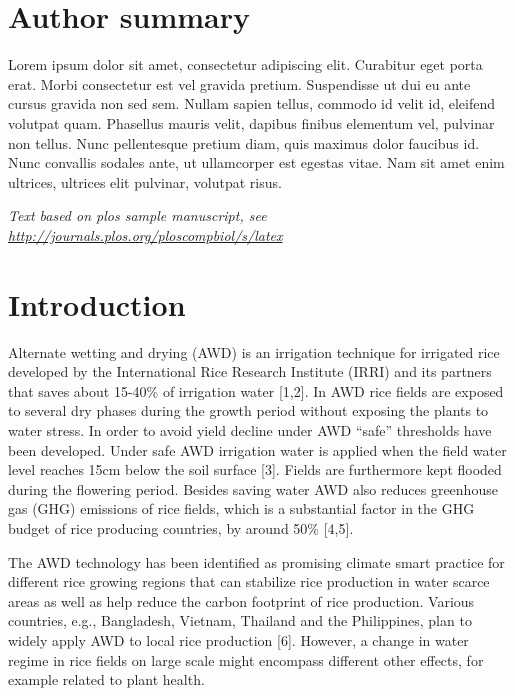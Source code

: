 \documentclass[10pt,letterpaper]{article}
\begin{document}
\section*{Author summary}
Lorem ipsum dolor sit amet, consectetur adipiscing elit. Curabitur eget
porta erat. Morbi consectetur est vel gravida pretium. Suspendisse ut
dui eu ante cursus gravida non sed sem. Nullam sapien tellus, commodo id
velit id, eleifend volutpat quam. Phasellus mauris velit, dapibus
finibus elementum vel, pulvinar non tellus. Nunc pellentesque pretium
diam, quis maximus dolor faucibus id. Nunc convallis sodales ante, ut
ullamcorper est egestas vitae. Nam sit amet enim ultrices, ultrices elit
pulvinar, volutpat risus.

\linenumbers

\emph{Text based on plos sample manuscript, see
\url{http://journals.plos.org/ploscompbiol/s/latex}}

\section{Introduction}\label{introduction}

Alternate wetting and drying (AWD) is an irrigation technique for
irrigated rice developed by the International Rice Research Institute
(IRRI) and its partners that saves about 15-40\% of irrigation water
{[}1,2{]}. In AWD rice fields are exposed to several dry phases during
the growth period without exposing the plants to water stress. In order
to avoid yield decline under AWD ``safe'' thresholds have been
developed. Under safe AWD irrigation water is applied when the field
water level reaches 15cm below the soil surface {[}3{]}. Fields are
furthermore kept flooded during the flowering period. Besides saving
water AWD also reduces greenhouse gas (GHG) emissions of rice fields,
which is a substantial factor in the GHG budget of rice producing
countries, by around 50\% {[}4,5{]}.

The AWD technology has been identified as promising climate smart
practice for different rice growing regions that can stabilize rice
production in water scarce areas as well as help reduce the carbon
footprint of rice production. Various countries, e.g., Bangladesh,
Vietnam, Thailand and the Philippines, plan to widely apply AWD to local
rice production {[}6{]}. However, a change in water regime in rice
fields on large scale might encompass different other effects, for
example related to plant health.
\end{document}
